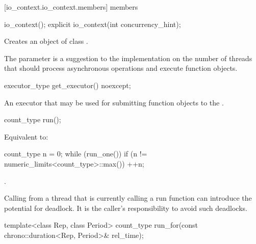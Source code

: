[io_context.io_context.members]{ members}

%
\begin{itemdecl}
io_context();
explicit io_context(int concurrency_hint);
\end{itemdecl}

\begin{itemdescr}
\pnum
\effects Creates an object of class .

\pnum
\remarks The  parameter is a suggestion to the implementation on the number of threads that should process asynchronous operations and execute function objects.
\end{itemdescr}

%
\begin{itemdecl}
executor_type get_executor() noexcept;
\end{itemdecl}

\begin{itemdescr}
\pnum
\returns An executor that may be used for submitting function objects to the .
\end{itemdescr}

%
\begin{itemdecl}
count_type run();
\end{itemdecl}

\begin{itemdescr}
\pnum
\effects Equivalent to:
\begin{codeblock}
count_type n = 0;
while (run_one())
  if (n != numeric_limits<count_type>::max())
    ++n;
\end{codeblock}

\pnum
\returns {}.

\pnum
\begin{note}
Calling  from a thread that is currently calling a run function
can introduce the potential for deadlock.
It is the caller's responsibility to avoid such deadlocks.
\end{note}
\end{itemdescr}

%
\begin{itemdecl}
template<class Rep, class Period>
  count_type run_for(const chrono::duration<Rep, Period>& rel_time);
\end{itemdecl}

